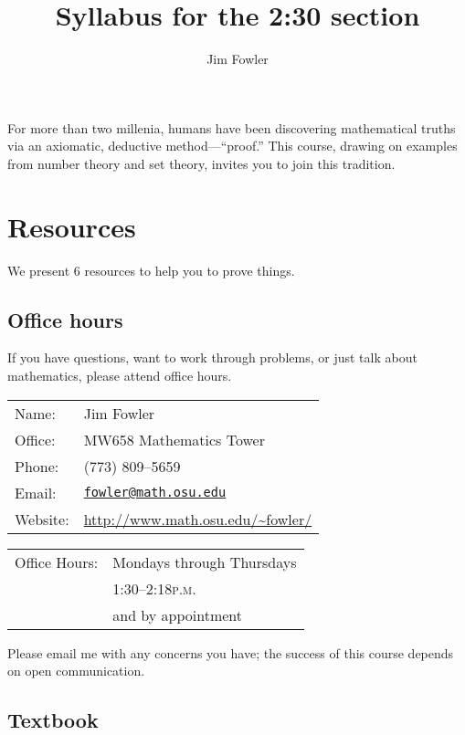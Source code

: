 \documentclass[12pt]{handout}
\title{Syllabus for the 2:30 section}
\author{Jim Fowler}
\newcommand{\peem}{\textsc{p.m.}}
\begin{document}
\maketitle

\noindent For more than two millenia, humans have been discovering
mathematical truths via an axiomatic, deductive method---``proof.''
This course, drawing on examples from number theory and set theory,
invites you to join this tradition.



\section*{Resources}

\noindent%
We present 6 resources to help you to prove things.

\subsection*{Office hours}
If you have questions, want to work through problems, or just talk
about mathematics, please attend office hours.

\vspace{1ex}%
\noindent\parbox{0.5\textwidth}{%
\noindent\begin{tabular}{@{}ll}
\textsf{Name:} & Jim Fowler \\
\textsf{Office:} & MW658 Mathematics Tower \\
\textsf{Phone:} & (773) 809--5659 \\
\textsf{Email:} & \href{mailto:fowler@math.osu.edu}{\texttt{fowler@math.osu.edu}} \\
\textsf{Website:} & \url{http://www.math.osu.edu/~fowler/}
\end{tabular}}
\noindent\parbox{0.5\textwidth}{%
\begin{tabular}{@{}ll}
\textsf{Office Hours:}
& Mondays through Thursdays \\
& 1:30--2:18\peem \\
& and by appointment
\end{tabular}}

\vspace{1ex}\noindent
Please email me with any concerns you have; the success of this course
depends on open communication.

\subsection*{Textbook}
\end{document}
